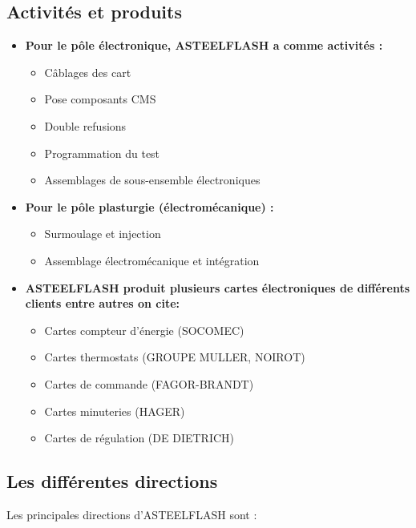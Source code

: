\subsection{Activités et produits}
    \begin{itemize}
        
    \item [$-$]\textbf {Pour le pôle électronique, ASTEELFLASH a comme activités :}

    \begin{itemize}[label=\textbullet]
    \item Câblages des cart
    \item Pose composants CMS
    \item Double refusions
    \item Programmation du test
    \item Assemblages de sous-ensemble électroniques
    \end{itemize}
   
    \item [$-$]\textbf { Pour le pôle plasturgie (électromécanique) :}
   
    \begin{itemize}[label=\textbullet]
    \item Surmoulage et injection
    \item Assemblage électromécanique et intégration
    \end{itemize}
    
    \item [$-$]\textbf { ASTEELFLASH produit plusieurs cartes électroniques de différents clients entre autres on cite:}
  \begin{itemize}[label=\textbullet]
    \item Cartes compteur d’énergie (SOCOMEC)
    \item Cartes thermostats (GROUPE MULLER, NOIROT)
    \item Cartes de commande (FAGOR-BRANDT)
    \item Cartes minuteries (HAGER)
    \item Cartes de régulation (DE DIETRICH)
    \end{itemize}
      \end{itemize}
\subsection{Les différentes directions}
   
    Les principales directions d’ASTEELFLASH sont : 
   
